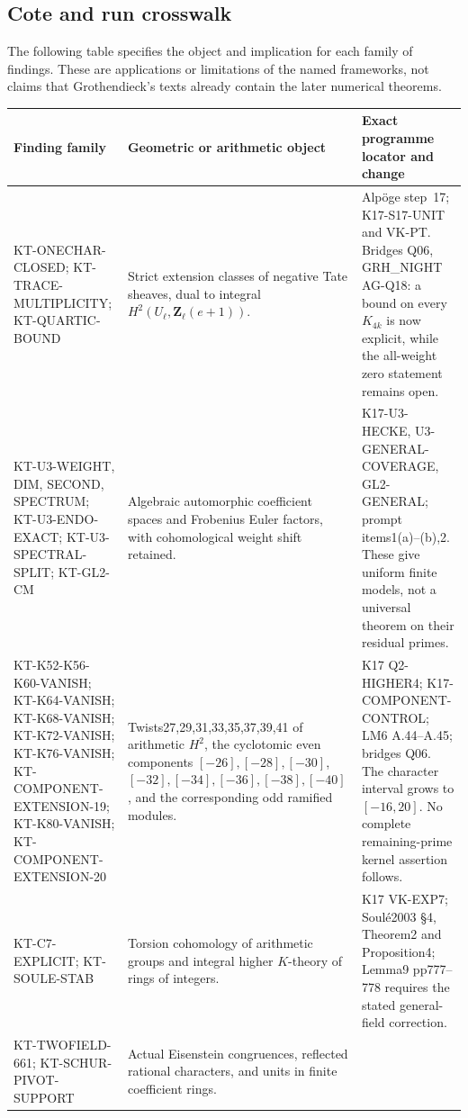 \documentclass[11pt,a4paper]{article}
\theoremstyle{definition}
\begin{document}
\subsection{Cote and run crosswalk}

The following table specifies the object and implication for
each family of findings. These are applications or limitations
of the named frameworks, not claims that Grothendieck's texts
already contain the later numerical theorems.

\small
\begin{longtable}{>{\raggedright\arraybackslash}p{}
>{\raggedright\arraybackslash}p{}
>{\raggedright\arraybackslash}p{}}
\toprule
Finding family & Geometric or arithmetic object & Exact programme locator and change\\
\midrule\endhead
KT-ONECHAR-CLOSED; KT-TRACE-MULTIPLICITY; KT-QUARTIC-BOUND &
Strict extension classes of negative Tate sheaves, dual to
integral $H^2(U_\ell,\mathbf Z_\ell(e+1))$. &
Alp\"oge step~17; K17-S17-UNIT and VK-PT. Bridges Q06,
GRH\_NIGHT AG-Q18: a bound on every $K_{4k}$ is now explicit,
while the all-weight zero statement remains open.\\
KT-U3-WEIGHT, DIM, SECOND, SPECTRUM; KT-U3-ENDO-EXACT; KT-U3-SPECTRAL-SPLIT; KT-GL2-CM &
Algebraic automorphic coefficient spaces and Frobenius Euler
factors, with cohomological weight shift retained. &
K17-U3-HECKE, U3-GENERAL-COVERAGE, GL2-GENERAL; prompt
items1(a)--(b),2. These give uniform finite models, not a
universal theorem on their residual primes.\\
KT-K52-K56-K60-VANISH; KT-K64-VANISH; KT-K68-VANISH; KT-K72-VANISH;
KT-K76-VANISH; KT-COMPONENT-EXTENSION-19;
KT-K80-VANISH; KT-COMPONENT-EXTENSION-20 &
Twists27,29,31,33,35,37,39,41 of arithmetic $H^2$, the cyclotomic even components
$[-26],[-28],[-30]$, $[-32],[-34],[-36],[-38],[-40]$, and the corresponding odd ramified modules. &
K17 Q2-HIGHER4; K17-COMPONENT-CONTROL; LM6 A.44--A.45;
bridges Q06. The character interval grows to $[-16,20]$.
No complete remaining-prime kernel assertion follows.\\
KT-C7-EXPLICIT; KT-SOULE-STAB &
Torsion cohomology of arithmetic groups and integral higher
$K$-theory of rings of integers. &
K17 VK-EXP7; Soul\'e2003 \S4, Theorem2 and Proposition4;
Lemma9 pp777--778 requires the stated general-field correction.\\
KT-TWOFIELD-661; KT-SCHUR-PIVOT-SUPPORT &
Actual Eisenstein congruences, reflected rational characters,
and units in finite coefficient rings. &

\end{longtable}
\end{document}

